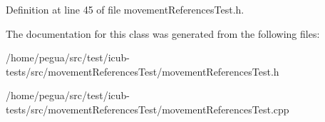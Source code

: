 Definition at line 45 of file movement\-References\-Test.\-h.



The documentation for this class was generated from the following files\-:\begin{DoxyCompactItemize}
\item 
/home/pegua/src/test/icub-\/tests/src/movement\-References\-Test/movement\-References\-Test.\-h\item 
/home/pegua/src/test/icub-\/tests/src/movement\-References\-Test/movement\-References\-Test.\-cpp\end{DoxyCompactItemize}
